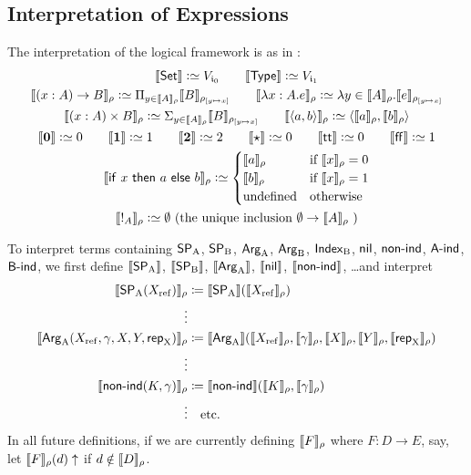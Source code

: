 \documentclass{article}
\begin{document}
\subsection{Interpretation of Expressions}
\noindent 
The interpretation of the logical framework is as in
\cite{dybjersetzer1999finax}:
\begin{gather*}
\sem{\Set} \colonsimeq V_{\cardz} \qquad \sem{\TYPE} \colonsimeq V_{\cardi} \\
\sem{(x : A) \to B}_\rho \colonsimeq \Pi_{y \in
  \sem{A}_\rho}\sem{B}_{\rhoextend{y}{x}} \qquad
\sem{\lambda x:A.e}_\rho \colonsimeq \lambda y \in
\sem{A}_\rho.\sem{e}_{\rhoextend{y}{x}} \\
\sem{(x : A) \times B}_\rho \colonsimeq \Sigma_{y \in
  \sem{A}_\rho}\sem{B}_{\rhoextend{y}{x}} \qquad
\sem{\langle a, b \rangle}_\rho \colonsimeq \langle \sem{a}_\rho ,
\sem{b}_\rho\rangle \\
\sem{\zero} \colonsimeq 0 \qquad \sem{\one} \colonsimeq 1 \qquad
\sem{\two} \colonsimeq 2 \qquad \sem{\oneelt} \colonsimeq 0 \qquad \sem{\twott} \colonsimeq 0 \qquad
\sem{\twoff} \colonsimeq 1\\
\sem{\IF~x~\THEN~a~\ELSE~b}_\rho \colonsimeq
\begin{cases}
\sem{a}_\rho & \text{if $\sem{x}_\rho = 0$} \\
\sem{b}_\rho & \text{if $\sem{x}_\rho = 1$} \\
\text{undefined} & \text{otherwise} \\
\end{cases} \\
\sem{\magic{A}}_\rho \colonsimeq \emptyset \text{ (the unique inclusion $\emptyset \to \sem{A}_\rho$ )}
\end{gather*}

To interpret terms containing $\SPA$, $\SPB$, $\ArgA$, $\ArgB$, $\IndexB$, 
$\nilA$, $\nonindA$, $\AindA$, $\BindA$, we first define $\sem{\SPA}$,
$\sem{\SPB}$, $\sem{\ArgA}$, $\sem{\nilA}$, $\sem{\nonindA}$, \ldots and interpret
\begin{align*}
\sem{\SPA(\Xref)}_\rho &\coloneqq \sem{\SPA}(\sem{\Xref}_\rho) \\
\vdots \\
\sem{\ArgA(\Xref, \gamma, X, Y, \repA)}_\rho &\coloneqq
\sem{\ArgA}(\sem{\Xref}_\rho, \sem{\gamma}_\rho, \sem{X}_\rho, \sem{Y}_\rho, \sem{\repA}_\rho) \\
\vdots \\
\sem{\nonindA(K, \gamma)}_\rho &\coloneqq \sem{\nonindA}(\sem{K}_\rho,
\sem{\gamma}_\rho) \\
\vdots & \text{\quad etc.}
\end{align*}
In all future definitions, if we are currently defining $\sem{F}_{\rho}$ where $F : D
\to E$, say, let $\sem{F}_{\rho}(d)\uparrow$ if $d \notin \sem{D}_{\rho}$.
\end{document}
